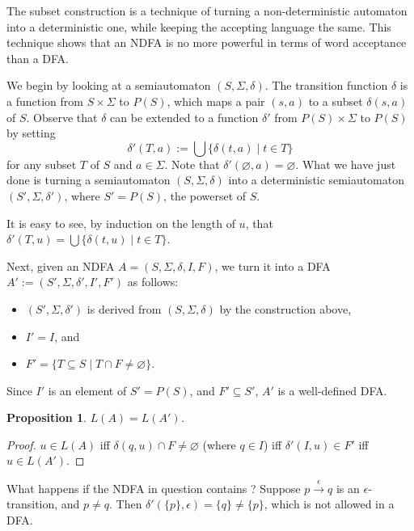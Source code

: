 \documentclass[12pt]{article}
\newtheorem{prop}{Proposition}
\begin{document}
The subset construction is a technique of turning a non-deterministic automaton into a deterministic one, while keeping the accepting language the same.  This technique shows that an NDFA is no more powerful in terms of word acceptance than a DFA.

We begin by looking at a semiautomaton $(S,\Sigma,\delta)$.  The transition function $\delta$ is a function from $S\times \Sigma$ to $P(S)$, which maps a pair $(s,a)$ to a subset $\delta(s,a)$ of $S$.  Observe that $\delta$ can be extended to a function $\delta'$ from $P(S)\times \Sigma$ to $P(S)$ by setting 
\begin{equation}
\delta'(T,a):=\bigcup \lbrace \delta(t,a)\mid t\in T\rbrace
\end{equation}
for any subset $T$ of $S$ and $a\in \Sigma$.  Note that $\delta'(\varnothing,a)=\varnothing$.  What we have just done is turning a semiautomaton $(S,\Sigma,\delta)$ into a deterministic semiautomaton $(S',\Sigma,\delta')$, where $S'=P(S)$, the powerset of $S$.

It is easy to see, by induction on the length of $u$, that $\delta'(T,u)=\bigcup \lbrace \delta(t,u)\mid t\in T\rbrace$.

Next, given an NDFA $A=(S,\Sigma,\delta,I,F)$, we turn it into a DFA $A':=(S',\Sigma,\delta',I',F')$ as follows:
\begin{itemize}
\item $(S',\Sigma,\delta')$ is derived from $(S,\Sigma,\delta)$ by the construction above,
\item $I'=I$, and
\item $F'=\lbrace T\subseteq S\mid T\cap F\ne \varnothing\rbrace$.
\end{itemize}
Since $I'$ is an element of $S'=P(S)$, and $F'\subseteq S'$, $A'$ is a well-defined DFA.

\begin{prop} $L(A)=L(A')$. \end{prop}
\begin{proof} $u\in L(A)$ iff $\delta(q,u)\cap F\ne \varnothing$ (where $q\in I$) iff $\delta'(I,u) \in F'$ iff $u\in L(A')$.
\end{proof}

What happens if the NDFA in question contains ?  Suppose $p\stackrel{\epsilon}{\rightarrow} q$ is an $\epsilon$-transition, and $p\ne q$.  Then $\delta'(\lbrace p \rbrace,\epsilon) = \lbrace q\rbrace \ne \lbrace p\rbrace$, which is not allowed in a DFA.
\end{document}
